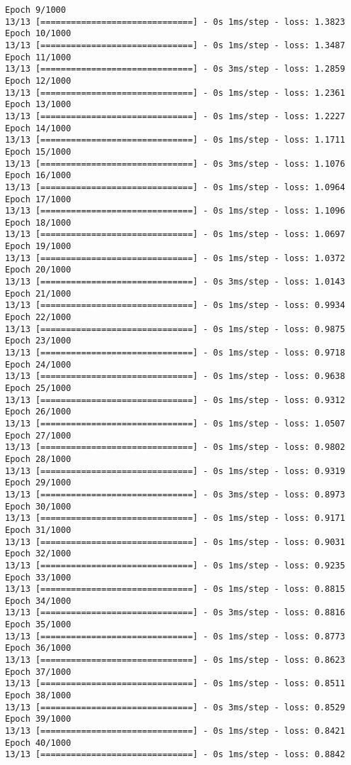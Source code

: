 \documentclass[11pt]{article}
\begin{document}
\begin{Verbatim}[commandchars=\\\{\}]
Epoch 9/1000
13/13 [==============================] - 0s 1ms/step - loss: 1.3823
Epoch 10/1000
13/13 [==============================] - 0s 1ms/step - loss: 1.3487
Epoch 11/1000
13/13 [==============================] - 0s 3ms/step - loss: 1.2859
Epoch 12/1000
13/13 [==============================] - 0s 1ms/step - loss: 1.2361
Epoch 13/1000
13/13 [==============================] - 0s 1ms/step - loss: 1.2227
Epoch 14/1000
13/13 [==============================] - 0s 1ms/step - loss: 1.1711
Epoch 15/1000
13/13 [==============================] - 0s 3ms/step - loss: 1.1076
Epoch 16/1000
13/13 [==============================] - 0s 1ms/step - loss: 1.0964
Epoch 17/1000
13/13 [==============================] - 0s 1ms/step - loss: 1.1096
Epoch 18/1000
13/13 [==============================] - 0s 1ms/step - loss: 1.0697
Epoch 19/1000
13/13 [==============================] - 0s 1ms/step - loss: 1.0372
Epoch 20/1000
13/13 [==============================] - 0s 3ms/step - loss: 1.0143
Epoch 21/1000
13/13 [==============================] - 0s 1ms/step - loss: 0.9934
Epoch 22/1000
13/13 [==============================] - 0s 1ms/step - loss: 0.9875
Epoch 23/1000
13/13 [==============================] - 0s 1ms/step - loss: 0.9718
Epoch 24/1000
13/13 [==============================] - 0s 1ms/step - loss: 0.9638
Epoch 25/1000
13/13 [==============================] - 0s 1ms/step - loss: 0.9312
Epoch 26/1000
13/13 [==============================] - 0s 1ms/step - loss: 1.0507
Epoch 27/1000
13/13 [==============================] - 0s 1ms/step - loss: 0.9802
Epoch 28/1000
13/13 [==============================] - 0s 1ms/step - loss: 0.9319
Epoch 29/1000
13/13 [==============================] - 0s 3ms/step - loss: 0.8973
Epoch 30/1000
13/13 [==============================] - 0s 1ms/step - loss: 0.9171
Epoch 31/1000
13/13 [==============================] - 0s 1ms/step - loss: 0.9031
Epoch 32/1000
13/13 [==============================] - 0s 1ms/step - loss: 0.9235
Epoch 33/1000
13/13 [==============================] - 0s 1ms/step - loss: 0.8815
Epoch 34/1000
13/13 [==============================] - 0s 3ms/step - loss: 0.8816
Epoch 35/1000
13/13 [==============================] - 0s 1ms/step - loss: 0.8773
Epoch 36/1000
13/13 [==============================] - 0s 1ms/step - loss: 0.8623
Epoch 37/1000
13/13 [==============================] - 0s 1ms/step - loss: 0.8511
Epoch 38/1000
13/13 [==============================] - 0s 3ms/step - loss: 0.8529
Epoch 39/1000
13/13 [==============================] - 0s 1ms/step - loss: 0.8421
Epoch 40/1000
13/13 [==============================] - 0s 1ms/step - loss: 0.8842

\end{Verbatim}
\end{document}
